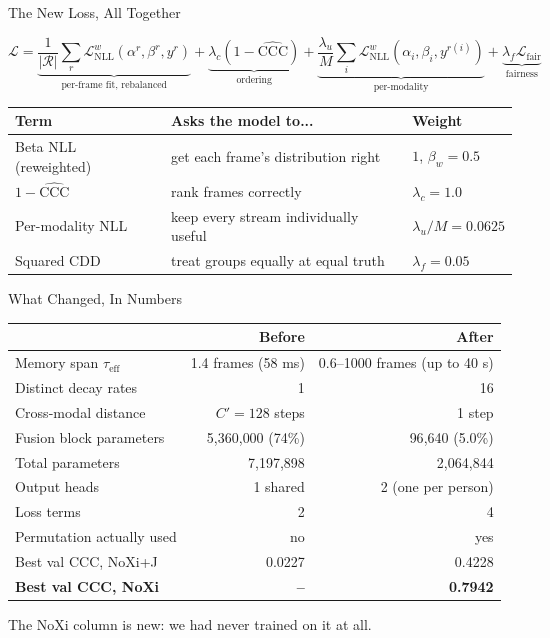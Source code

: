 \documentclass[aspectratio=169]{beamer}
\begin{document}
	\begin{frame}{The New Loss, All Together}
		\begin{block}{}
			$$ \mathcal{L} =
			\underbrace{\frac{1}{|\mathcal{R}|}\sum_{r} \mathcal{L}^{w}_{\text{NLL}}(\alpha^r,\beta^r,y^r)}_{\text{per-frame fit, rebalanced}}
			+ \underbrace{\lambda_c(1 - \widehat{\text{CCC}})}_{\text{ordering}}
			+ \underbrace{\frac{\lambda_u}{M}\sum_{i} \mathcal{L}^{w}_{\text{NLL}}(\alpha_i,\beta_i,y^{r(i)})}_{\text{per-modality}}
			+ \underbrace{\lambda_f \mathcal{L}_{\text{fair}}}_{\text{fairness}} $$
		\end{block}
		\vspace{0.4em}
		\begin{center}
			\small
			\begin{tabular}{lll}
				\textbf{Term} & \textbf{Asks the model to...} & \textbf{Weight} \\
				\hline
				Beta NLL (reweighted) & get each frame's distribution right & $1$, $\beta_w = 0.5$ \\
				$1 - \widehat{\text{CCC}}$ & rank frames correctly & $\lambda_c = 1.0$ \\
				Per-modality NLL & keep every stream individually useful & $\lambda_u/M = 0.0625$ \\
				Squared CDD & treat groups equally at equal truth & $\lambda_f = 0.05$ \\
			\end{tabular}
		\end{center}
	\end{frame}


	\begin{frame}{What Changed, In Numbers}
		\begin{center}
			\small
			\begin{tabular}{lrr}
				& \textbf{Before} & \textbf{After} \\
				\hline
				Memory span $\tau_{\text{eff}}$ & 1.4 frames (58 ms) & 0.6--1000 frames (up to 40 s) \\
				Distinct decay rates & 1 & 16 \\
				Cross-modal distance & $C' = 128$ steps & 1 step \\
				Fusion block parameters & 5{,}360{,}000 (74\%) & 96{,}640 (5.0\%) \\
				Total parameters & 7{,}197{,}898 & 2{,}064{,}844 \\
				Output heads & 1 shared & 2 (one per person) \\
				Loss terms & 2 & 4 \\
				Permutation actually used & no & yes \\
				\hline
				Best val CCC, NoXi+J & 0.0227 & 0.4228 \\
				\textbf{Best val CCC, NoXi} & \textbf{--} & \textbf{0.7942} \\
			\end{tabular}
		\end{center}
		\vspace{0.4em}
		\centering\small
		The NoXi column is new: we had never trained on it at all.
	\end{frame}
\end{document}
